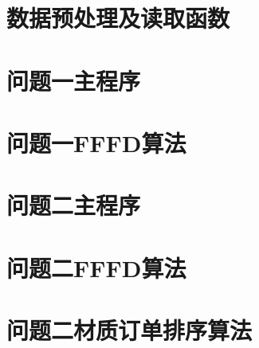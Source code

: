 \documentclass[bwprint]{gmcmthesis}
\begin{document}
\newpage
\appendix
\newpage
\section{数据预处理及读取函数}\label{数据预处理及读取函数}
\section{问题一主程序}
\section{问题一FFFD算法}\label{问题一FFFD算法}
\section{问题二主程序}
\section{问题二FFFD算法}
\section{问题二材质订单排序算法}
\newpage
\end{document}
